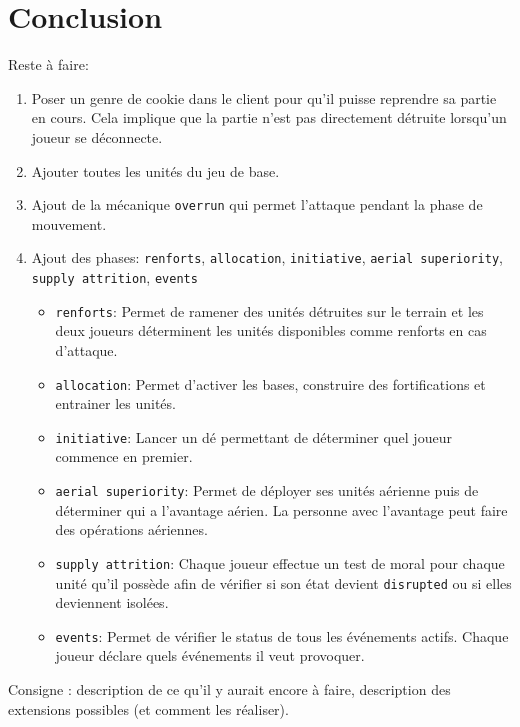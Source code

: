 \section{Conclusion}

Reste à faire:
\begin{enumerate}
    \item Poser un genre de cookie dans le client pour qu'il puisse reprendre sa partie en cours.
          Cela implique que la partie n'est pas directement détruite lorsqu'un joueur se déconnecte.
    \item Ajouter toutes les unités du jeu de base.
    \item Ajout de la mécanique {\tt overrun} qui permet l'attaque pendant la phase de mouvement.
    \item Ajout des phases: {\tt renforts}, {\tt allocation}, {\tt initiative}, {\tt aerial superiority}, {\tt supply attrition}, {\tt events}
          \begin{itemize}
              \item {\tt renforts}: Permet de ramener des unités détruites sur le terrain et les deux joueurs déterminent les unités disponibles comme renforts en cas d'attaque.
              \item {\tt allocation}: Permet d'activer les bases, construire des fortifications et entrainer les unités.
              \item {\tt initiative}: Lancer un dé permettant de déterminer quel joueur commence en premier.
              \item {\tt aerial superiority}: Permet de déployer ses unités aérienne puis de déterminer qui a l'avantage aérien.
                    La personne avec l'avantage peut faire des opérations aériennes.
              \item {\tt supply attrition}: Chaque joueur effectue un test de moral pour chaque unité qu'il possède afin de vérifier si son état devient {\tt disrupted} ou si elles deviennent isolées.
              \item {\tt events}: Permet de vérifier le status de tous les événements actifs. Chaque joueur déclare quels événements il veut provoquer.
          \end{itemize}
\end{enumerate}

Consigne : description de ce qu’il y aurait encore à faire, description des extensions possibles (et comment les réaliser).